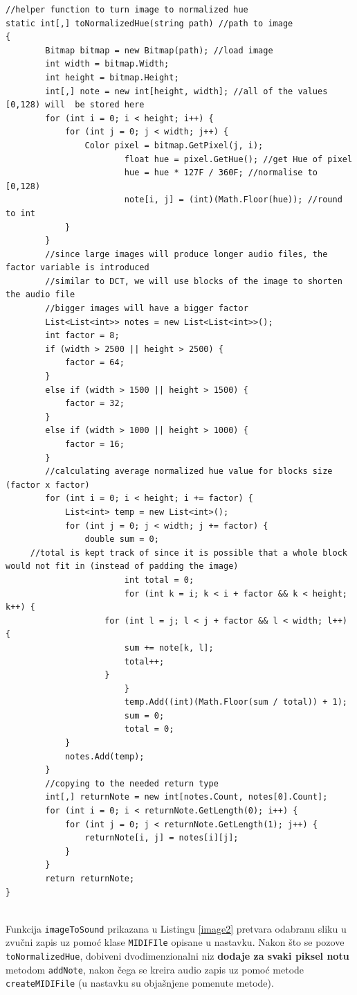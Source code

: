 \documentclass[12pt,a4paper]{article}
\begin{document}
\begin{lstlisting}[language={[Sharp]C}, caption={Funkcija \texttt{toNormalizedHue} za pretvaranje boja u tonove}, label={image1}]
//helper function to turn image to normalized hue
static int[,] toNormalizedHue(string path) //path to image
{
		Bitmap bitmap = new Bitmap(path); //load image
		int width = bitmap.Width;
		int height = bitmap.Height;
		int[,] note = new int[height, width]; //all of the values [0,128) will  be stored here
		for (int i = 0; i < height; i++) {
			for (int j = 0; j < width; j++) {
				Color pixel = bitmap.GetPixel(j, i);
                   		float hue = pixel.GetHue(); //get Hue of pixel
                   		hue = hue * 127F / 360F; //normalise to [0,128)
                   		note[i, j] = (int)(Math.Floor(hue)); //round to int
			}
		}
		//since large images will produce longer audio files, the factor variable is introduced
		//similar to DCT, we will use blocks of the image to shorten the audio file
		//bigger images will have a bigger factor
		List<List<int>> notes = new List<List<int>>();
		int factor = 8;
		if (width > 2500 || height > 2500) {
			factor = 64;
		}
		else if (width > 1500 || height > 1500) {
			factor = 32;
		}
		else if (width > 1000 || height > 1000) {
			factor = 16;
		}
		//calculating average normalized hue value for blocks size (factor x factor)
		for (int i = 0; i < height; i += factor) {
			List<int> temp = new List<int>();
			for (int j = 0; j < width; j += factor) {
				double sum = 0;
     //total is kept track of since it is possible that a whole block would not fit in (instead of padding the image)
                    	int total = 0;
                    	for (int k = i; k < i + factor && k < height; k++) {
					for (int l = j; l < j + factor && l < width; l++) {
						sum += note[k, l];
						total++;
					}
                    	}
                    	temp.Add((int)(Math.Floor(sum / total)) + 1);
                    	sum = 0;
                    	total = 0;
			}	
			notes.Add(temp);
		}
		//copying to the needed return type
		int[,] returnNote = new int[notes.Count, notes[0].Count];
		for (int i = 0; i < returnNote.GetLength(0); i++) {
			for (int j = 0; j < returnNote.GetLength(1); j++) {
				returnNote[i, j] = notes[i][j];
			}
		}
		return returnNote;
}
\end{lstlisting}
~\\
Funkcija \texttt{imageToSound} prikazana u Listingu \ref{image2} pretvara odabranu sliku u zvučni zapis uz pomoć klase \texttt{MIDIFIle} opisane u nastavku. Nakon što se pozove \texttt{toNormalizedHue}, dobiveni dvodimenzionalni niz \textbf{dodaje za svaki piksel notu} metodom \texttt{addNote}, nakon čega se kreira audio zapis uz pomoć metode \texttt{createMIDIFile} (u nastavku su objašnjene pomenute metode).
\end{document}
